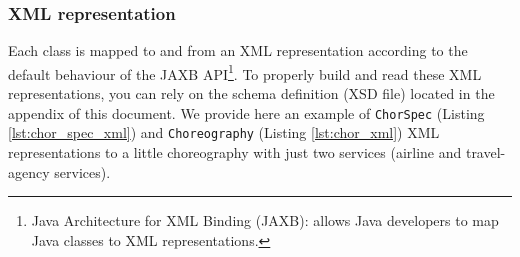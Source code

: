 \documentclass[a4paper, 10pt]{article}
\begin{document}
\subsubsection*{XML representation}

Each class is mapped to and from an XML representation according to the default behaviour of the JAXB API\footnote{Java Architecture for XML Binding (JAXB): allows Java developers to map Java classes to XML representations.}. 
To properly build and read these XML representations, you can rely on the schema definition (XSD file) located in the appendix of this document. We provide here an example of \verb!ChorSpec! (Listing \ref{lst:chor_spec_xml}) and \verb!Choreography! (Listing \ref{lst:chor_xml}) XML representations to a little choreography with just two services (airline and travel-agency services). 
\end{document}
